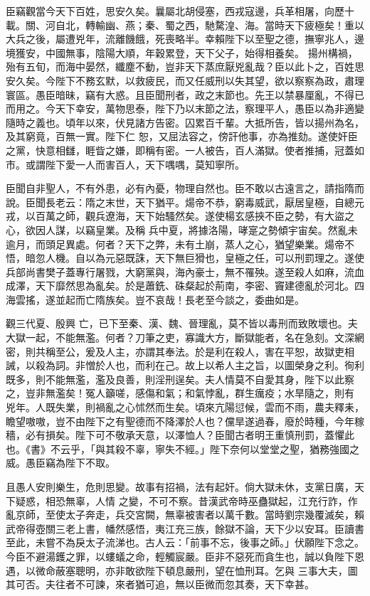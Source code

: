 \begin{pinyinscope}
 臣竊觀當今天下百姓，思安久矣。曩屬北胡侵塞，西戎寇邊，兵革相屠，向歷十載。關、河自北，轉輸幽、燕；秦、蜀之西，馳騖湟、海。當時天下疲極矣！重以大兵之後，屬遭兇年，流離饑餓，死喪略半。幸賴陛下以至聖之德，撫寧兆人，邊境獲安，中國無事，陰陽大順，年穀累登，天下父子，始得相養矣。
 揚州構禍，殆有五旬，而海中晏然，纖塵不動，豈非天下蒸庶厭兇亂哉？臣以此卜之，百姓思安久矣。今陛下不務玄默，以救疲民，而又任威刑以失其望，欲以察察為政，肅理寰區。愚臣暗昧，竊有大惑。且臣聞刑者，政之末節也。先王以禁暴厘亂，不得已而用之。今天下幸安，萬物思泰，陛下乃以末節之法，察理平人，愚臣以為非適變隨時之義也。頃年以來，伏見諸方告密。囚累百千輩。大抵所告，皆以揚州為名，及其窮竟，百無一實。陛下仁
 恕，又屈法容之，傍訐他事，亦為推劾。遂使奸臣之黨，快意相讎，睚眥之嫌，即稱有密。一人被告，百人滿獄。使者推捕，冠蓋如市。或謂陛下愛一人而害百人，天下喁喁，莫知寧所。



 臣聞自非聖人，不有外患，必有內憂，物理自然也。臣不敢以古遠言之，請指隋而說。臣聞長老云：隋之末世，天下猶平。煬帝不恭，窮毒威武，厭居皇極，自總元戎，以百萬之師，觀兵遼海，天下始騷然矣。遂使楊玄感挾不臣之勢，有大盜之心，欲因人謀，以竊皇業。及稱
 兵中夏，將據洛陽，哮寔之勢傾宇宙矣。然亂未逾月，而頭足異處。何者？天下之弊，未有土崩，蒸人之心，猶望樂業。煬帝不悟，暗忽人機。自以為元惡既誅，天下無巨猾也，皇極之任，可以刑罰理之。遂使兵部尚書樊子蓋專行屠戮，大窮黨與，海內豪士，無不罹殃。遂至殺人如麻，流血成澤，天下靡然思為亂矣。於是蕭銑、硃粲起於荊南，李密、竇建德亂於河北。四海雲搖，遂並起而亡隋族矣。豈不哀哉！長老至今談之，委曲如是。



 觀三代夏、殷興
 亡，已下至秦、漢、魏、晉理亂，莫不皆以毒刑而致敗壞也。夫大獄一起，不能無濫。何者？刀筆之吏，寡識大方，斷獄能者，名在急刻。文深網密，則共稱至公，爰及人主，亦謂其奉法。於是利在殺人，害在平恕，故獄吏相誡，以殺為詞。非憎於人也，而利在己。故上以希人主之旨，以圖榮身之利。徇利既多，則不能無濫，濫及良善，則淫刑逞矣。夫人情莫不自愛其身，陛下以此察之，豈非無濫矣！冤人籲嗟，感傷和氣；和氣悖亂，群生癘疫；水旱隨之，則有
 兇年。人既失業，則禍亂之心怵然而生矣。頃來亢陽愆候，雲而不雨，農夫釋耒，瞻望嗷嗷，豈不由陛下之有聖德而不降澤於人也？儻旱遂過春，廢於時種，今年稼穡，必有損矣。陛下可不敬承天意，以澤恤人？臣聞古者明王重慎刑罰，蓋懼此也。《書》不云乎，「與其殺不辜，寧失不經。」陛下奈何以堂堂之聖，猶務強國之威。愚臣竊為陛下不取。



 且愚人安則樂生，危則思變。故事有招禍，法有起奸。倘大獄未休，支黨日廣，天下疑惑，相恐無辜，人情
 之變，不可不察。昔漢武帝時巫蠱獄起，江充行詐，作亂京師，至使太子奔走，兵交宮闕，無辜被害者以萬千數。當時劉宗幾覆滅矣，賴武帝得壺關三老上書，幡然感悟，夷江充三族，餘獄不論，天下少以安耳。臣讀書至此，未嘗不為戾太子流涕也。古人云：「前事不忘，後事之師。」伏願陛下念之。今臣不避湯鑊之罪，以螻蟻之命，輕觸宸嚴。臣非不惡死而貪生也，誠以負陛下恩遇，以微命蔽塞聰明，亦非敢欲陛下頓息嚴刑，望在恤刑耳。乞與
 三事大夫，圖其可否。夫往者不可諫，來者猶可追，無以臣微而忽其奏，天下幸甚。




\end{pinyinscope}
